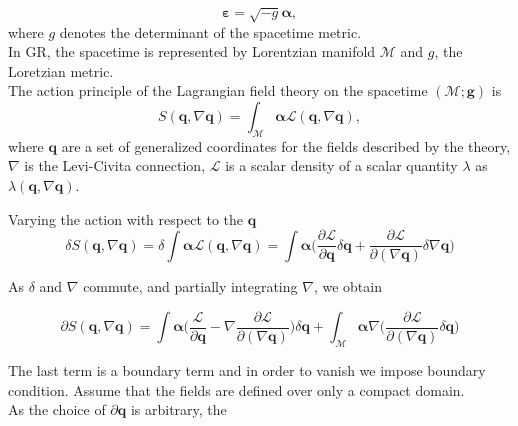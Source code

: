 \documentclass[11pt,a4paper,headinclude=true,DIV=14,BCOR=8mm,chapterprefix,listof=totoc,twoside,openright,abstracton]{scrbook}
\begin{document}
\begin{equation}
    \boldsymbol{\varepsilon} = \sqrt{-g}\boldsymbol{\alpha},
\end{equation}
where $g$ denotes the determinant of the spacetime metric. \\

In GR, the spacetime is represented by Lorentzian manifold $\mathcal{M}$ and $g$, the Loretzian metric. \\

The action principle of the Lagrangian field theory on the spacetime $(\mathcal{M}; \boldsymbol{g})$ is
\begin{equation}
    S(\boldsymbol{q}, \nabla\boldsymbol{q}) = \int_{\mathcal{M}}\boldsymbol{\alpha}\mathcal{L}(\boldsymbol{q}, \nabla\boldsymbol{q}),
\end{equation}
where $\boldsymbol{q}$ are a set of generalized coordinates for the fields described by the theory, $\nabla$ is the Levi-Civita connection, $\mathcal{L}$ is a scalar density of a scalar quantity $\lambda$ as $\lambda(\boldsymbol{q},\nabla\boldsymbol{q})$. 

Varying the action with respect to the $\boldsymbol{q}$
\begin{equation}
    \delta S(\boldsymbol{q}, \nabla\boldsymbol{q}) = \delta\int\boldsymbol{\alpha}\mathcal{L}(\boldsymbol{q}, \nabla\boldsymbol{q}) = \int\boldsymbol{\alpha}\Big(\frac{\partial\mathcal{L}}{\partial\boldsymbol{q}}\delta\boldsymbol{q}+\frac{\partial\mathcal{L}}{\partial(\nabla\boldsymbol{q})}\delta\nabla\boldsymbol{q}\Big)
\end{equation}

As $\delta$ and $\nabla$ commute, and partially integrating $\nabla$, we obtain

\begin{equation}
    \partial S(\boldsymbol{q}, \nabla\boldsymbol{q}) = \int\boldsymbol{\alpha}\Big(\frac{\mathcal{L}}{\partial\boldsymbol{q}}-\nabla\frac{\partial \mathcal{L}}{\partial(\nabla\boldsymbol{q})}\Big)\delta\boldsymbol{q} + \int_{\mathcal{M}}\boldsymbol{\alpha}\nabla\Big(\frac{\partial\mathcal{L}}{\partial(\nabla\boldsymbol{q})}\delta\boldsymbol{q}\Big)
\end{equation}

The last term is a boundary term and in order to vanish we impose boundary condition. Assume that the fields are defined over only a compact domain. \\
As the choice of $\partial\boldsymbol{q}$ is arbitrary, the 
\end{document}
